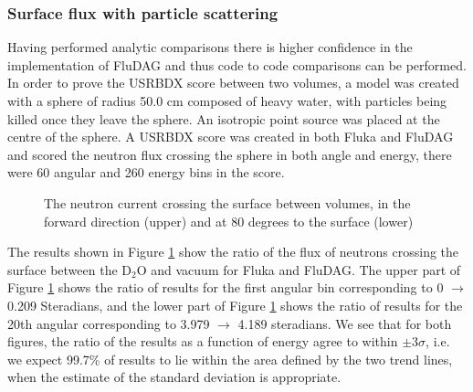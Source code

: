 \documentclass{anstrans}
\begin{document}
\subsubsection*{Surface flux with particle scattering}
Having performed analytic comparisons there is higher confidence in
the implementation of FluDAG and thus code to code comparisons can be
performed. In order to prove the USRBDX score between two volumes, a
model was created with a sphere of radius 50.0 cm composed of heavy
water, with particles being killed once they leave the sphere. An
isotropic point source was placed at the centre of the sphere. A
USRBDX score was created in both Fluka and FluDAG and scored the
neutron flux crossing the sphere in both angle and energy, there were
60 angular and 260 energy bins in the score.
\begin{figure}[h!]
	\begin{center}
		\caption{The neutron current crossing the surface between volumes, in the 
		forward direction (upper) and at 80 degrees to the surface (lower)}
	\end{center}
\label{mat_usrbdx}
\end{figure}
The results shown in Figure \ref{mat_usrbdx} show the ratio of the
flux of neutrons crossing the surface between the D$_2$O and vacuum
for Fluka and FluDAG. The upper part of Figure \ref{mat_usrbdx} shows
the ratio of results for the first angular bin corresponding to 0
$\to$ 0.209 Steradians, and the lower part of Figure \ref{mat_usrbdx}
shows the ratio of results for the 20th angular corresponding to 3.979
$\to$ 4.189 steradians. We see that for both figures, the ratio of the
results as a function of energy agree to within $\pm 3\sigma$, i.e. we
expect 99.7\% of results to lie within the area defined by the two
trend lines, when the estimate of the standard deviation is appropriate.
\end{document}
